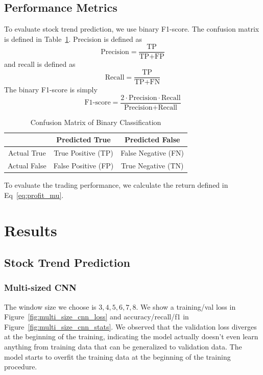 \documentclass[11pt,a4paper]{article}
\begin{document}
\subsection{Performance Metrics}
To evaluate stock trend prediction, we use binary F1-score. The confusion matrix is defined in Table~\ref{table:confusion}. Precision is defined as $$\text{Precision}=\frac{\text{TP}}{\text{TP}+\text{FP}}$$ and recall is defined as 
$$\text{Recall}=\frac{\text{TP}}{\text{TP}+\text{FN}}$$
The binary F1-score is simply
$$\text{F1-score}=\frac{2\cdot\text{Precision}\cdot\text{Recall}}{\text{Precision}+\text{Recall}}$$
\begin{table}
  \centering
  \caption{Confusion Matrix of Binary Classification}
  \begin{tabular}{|c|c|c|}
    \hline
    & Predicted True & Predicted False \\\hline
    Actual True & True Positive (TP) & False Negative (FN) \\\hline
    Actual False & False Positive (FP) & True Negative (TN) \\\hline
  \end{tabular}
  \label{table:confusion}
\end{table}

To evaluate the trading performance, we calculate the return defined in Eq~\ref{eq:profit_mu}.

\section{Results}

\subsection{Stock Trend Prediction}

\subsubsection{Multi-sized CNN}
The window size we choose is $3, 4, 5, 6, 7, 8$. We show a training/val loss in Figure~\ref{fig:multi_size_cnn_loss} and accuracy/recall/f1 in Figure~\ref{fig:multi_size_cnn_stats}. We observed that the validation loss diverges at the beginning of the training, indicating the model actually doesn't even learn anything from training data that can be generalized to validation data. The model starts to overfit the training data at the beginning of the training procedure.
\end{document}
